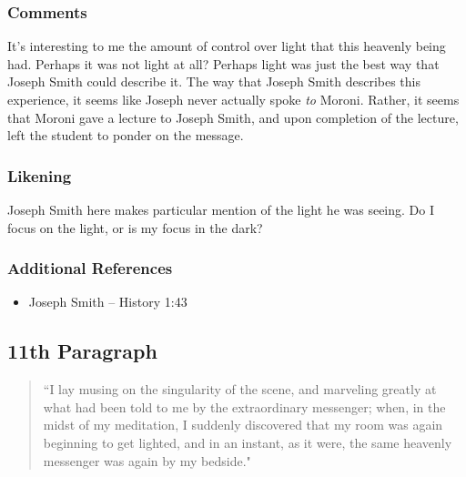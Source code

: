 \documentclass[12pt]{report}
\begin{document}
\subsubsection{Comments\label{js:comments10}}
It's interesting to me the amount of control over light that this heavenly being had.  Perhaps it was not light at all?  Perhaps light was just the best way that Joseph Smith could describe it.  The way that Joseph Smith describes this experience, it seems like Joseph never actually spoke \emph{to} Moroni.  Rather, it seems that Moroni gave a lecture to Joseph Smith, and upon completion of the lecture, left the student to ponder on the message.

\subsubsection{Likening\label{js:likening10}}
Joseph Smith here makes particular mention of the light he was seeing. Do I focus on the light, or is my focus in the dark?

\subsubsection{Additional References\label{js:reference10}}
\begin{itemize}
\item Joseph Smith -- History 1:43
\end{itemize}

\subsection{11th Paragraph\label{js:11th}}
\begin{center}
\begin{quote}
``I lay musing on the singularity of the scene, and marveling greatly at what had been told to me by the extraordinary messenger; when, in the midst of my meditation, I suddenly discovered that my room was again beginning to get lighted, and in an instant, as it were, the same heavenly messenger was again by my bedside."
\end{quote}
\end{center}
\end{document}
